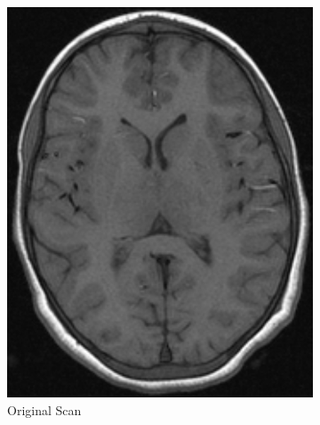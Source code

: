 \documentclass{standalone}
\begin{document}
\begin{figure}[h!]
		\centering
        \begin{subfigure}[b]{0.49\textwidth}
             \includegraphics[scale=0.3]{img/Chap3/T1W0.png}
             \caption{Original Scan} 
        \end{subfigure}
        \hfill
        \begin{subfigure}[b]{0.49\textwidth}

\end{subfigure}
\end{figure}
\end{document}
